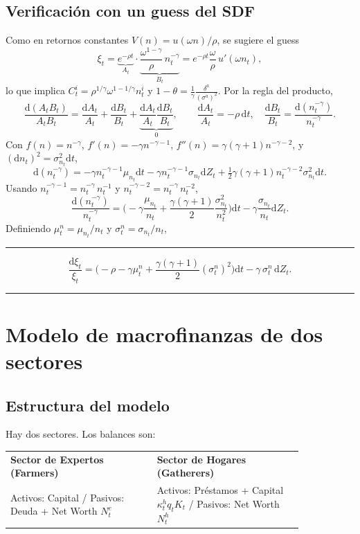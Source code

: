 \documentclass[11pt]{article}
\theoremstyle{definition}
\theoremstyle{remark}
\newenvironment{resultado}
  {\par\medskip\noindent\begin{minipage}{\linewidth}\rule{\linewidth}{0.4pt}\par\smallskip\noindent}
  {\par\smallskip\noindent\rule{\linewidth}{0.4pt}\end{minipage}\medskip\par}
\newcommand{\dd}{\mathrm{d}}
\begin{document}
\subsection{Verificación con un guess del SDF}

Como en retornos constantes $V(n)=u(\omega n)/\rho$, se sugiere el guess
\[
\xi_t=\underbrace{e^{-\rho t}}_{A_t}\cdot\underbrace{\frac{\omega^{1-\gamma}}{\rho}\,n_t^{-\gamma}}_{B_t}
=e^{-\rho t}\frac{\omega}{\rho}\,u'(\omega n_t),
\]
lo que implica $C_t^{i}=\rho^{1/\gamma}\omega^{1-1/\gamma}n_t^{i}$ y $1-\theta=\tfrac{1}{\gamma}\tfrac{\delta^{a}}{(\sigma^{a})^2}$. Por la regla del producto,
\[
\frac{\dd(A_tB_t)}{A_tB_t}=\frac{\dd A_t}{A_t}+\frac{\dd B_t}{B_t}+\underbrace{\frac{\dd A_t}{A_t}\frac{\dd B_t}{B_t}}_{0},
\qquad
\frac{\dd A_t}{A_t}=-\rho\,\dd t,\quad
\frac{\dd B_t}{B_t}=\frac{\dd(n_t^{-\gamma})}{n_t^{-\gamma}}.
\]
Con $f(n)=n^{-\gamma}$, $f'(n)=-\gamma n^{-\gamma-1}$, $f''(n)=\gamma(\gamma+1)n^{-\gamma-2}$, y $(\dd n_t)^2=\sigma_{n_t}^2\dd t$,
\[
\dd(n_t^{-\gamma})=-\gamma n_t^{-\gamma-1}\mu_{n_t}\dd t-\gamma n_t^{-\gamma-1}\sigma_{n_t}\dd Z_t
+\tfrac12\gamma(\gamma+1)n_t^{-\gamma-2}\sigma_{n_t}^2\dd t.
\]
Usando $n_t^{-\gamma-1}=n_t^{-\gamma}\,n_t^{-1}$ y $n_t^{-\gamma-2}=n_t^{-\gamma}\,n_t^{-2}$,
\[
\frac{\dd(n_t^{-\gamma})}{n_t^{-\gamma}}
=\Big(-\gamma\frac{\mu_{n_t}}{n_t}+\frac{\gamma(\gamma+1)}{2}\frac{\sigma_{n_t}^2}{n_t^2}\Big)\dd t-\gamma\frac{\sigma_{n_t}}{n_t}\dd Z_t.
\]
Definiendo $\mu_t^{n}=\mu_{n_t}/n_t$ y $\sigma_t^{n}=\sigma_{n_t}/n_t$,
\begin{resultado}
\begin{equation}\label{eq:sdf-process}
\frac{\dd\xi_t}{\xi_t}=\Big(-\rho-\gamma\mu_t^{n}+\frac{\gamma(\gamma+1)}{2}(\sigma_t^{n})^2\Big)\dd t-\gamma\,\sigma_t^{n}\,\dd Z_t.
\end{equation}
\end{resultado}

\section{Modelo de macrofinanzas de dos sectores}

\subsection{Estructura del modelo}

Hay dos sectores. Los balances son:
\begin{center}
\begin{tabular}{p{0.42\linewidth}p{0.42\linewidth}}
\textbf{Sector de Expertos (Farmers)} & \textbf{Sector de Hogares (Gatherers)}\\[2pt]
Activos: Capital \;/\; Pasivos: Deuda + Net Worth $N_t^{e}$ &
Activos: Préstamos + Capital $\kappa_t^{h}q_tK_t$ \;/\; Pasivos: Net Worth $N_t^{h}$
\end{tabular}
\end{center}
\end{document}

